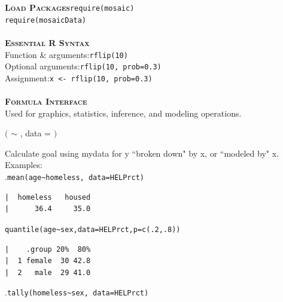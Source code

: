 \documentclass{article}\usepackage[]{graphicx}\usepackage[]{color}
\makeatletter
\newenvironment{kframe}{%
 \def\at@end@of@kframe{}%
 \ifinner\ifhmode%
  \def\at@end@of@kframe{\end{minipage}}%
  \begin{minipage}{\columnwidth}%
 \fi\fi%
 \def\FrameCommand##1{\hskip\@totalleftmargin \hskip-\fboxsep
 \colorbox{shadecolor}{##1}\hskip-\fboxsep
     \hskip-\linewidth \hskip-\@totalleftmargin \hskip\columnwidth}%
 \MakeFramed {\advance\hsize-\width
   \@totalleftmargin\z@ \linewidth\hsize
   \@setminipage}}%
 {\par\unskip\endMakeFramed%
 \at@end@of@kframe}
\newenvironment{knitrout}{}{} %
\newcommand{\Wspace}{{\tiny\color{white}.}\hfill}
\newcommand{\NewSection}[1]{{\noindent\color{blue}\bfseries\scshape#1}}
\makeatother
\begin{document}
\NewSection{Load Packages}\hfill\verb+require(mosaic)+\\ 
\hspace*{1cm}\hfill\verb+require(mosaicData)+\\
\\
\NewSection{Essential R Syntax}\\
Function \& arguments:\hfill \verb+rflip(10)+\\
Optional arguments:\hfill \verb+rflip(10, prob=0.3)+\\
Assignment:\hfill \verb+x <- rflip(10, prob=0.3)+\\
\\
\NewSection{Formula Interface}\\
Used for graphics, statistics, inference, and modeling operations.\\
\def\phbox#1{\fbox{\phantom{g#1l}}} %
\def\ffbox#1{\fbox{\phantom{g}#1\phantom{b}}} %
\vspace*{-.5cm}\begin{center}
	\sf
	\ffbox{goal} $\Big($ 
	\ffbox{y} $\sim$  \ffbox{x} {\LARGE,} data = \ffbox{mydata} $\Big)$
\end{center}
 {Calculate {\sf goal} using {\sf mydata} for {\sf y} ``broken down" by {\sf x}, or ``modeled by" {\sf x}.} Examples:\\
\Wspace\verb+mean(age~homeless, data=HELPrct)+%
\vspace*{-2mm}
\begin{knitrout}
\color{fgcolor}\begin{kframe}
\begin{verbatim}
|  homeless   housed 
|      36.4     35.0
\end{verbatim}
\end{kframe}
\end{knitrout}
\noindent\Wspace\verb+quantile(age~sex,data=HELPrct,p=c(.2,.8))+%
\vspace*{-6mm}
\begin{knitrout}
\color{fgcolor}\begin{kframe}
\begin{verbatim}
|    .group 20%  80%
|  1 female  30 42.8
|  2   male  29 41.0
\end{verbatim}
\end{kframe}
\end{knitrout}
\Wspace\verb+tally(homeless~sex, data=HELPrct)+%
\vspace*{-2mm}
\end{document}
